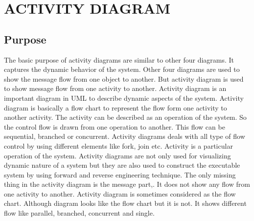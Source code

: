 \documentclass[12pt,a4paper,oneside]{report}
\begin{document}
\section{ACTIVITY DIAGRAM}
\subsection{Purpose}
The basic purpose of activity diagrams are similar to other four diagrams. It captures the dynamic behavior of the system. Other four diagrams are used to show the message flow from one object to another. But activity diagram is used to show message flow from one activity to another. Activity diagram is an important diagram in UML to describe dynamic aspects of the
system. Activity diagram is basically a flow chart to represent the flow form one activity to
another activity. The activity can be described as an operation of the system. So the control flow
is drawn from one operation to another. This flow can be sequential, branched or concurrent.
Activity diagrams deals with all type of flow control by using different elements like fork, join
etc. Activity is a particular operation of the system. Activity diagrams are not only used for visualizing dynamic nature of a system but they are also used to construct the executable system by using forward and reverse engineering technique. The only missing thing in the activity diagram is the message part,. It does not show any flow from one activity to another. Activity diagram is sometimes considered as the flow chart. Although diagram looks like the flow chart but it is not. It shows different flow like parallel, branched, concurrent and single.\\
\newpage
\end{document}
